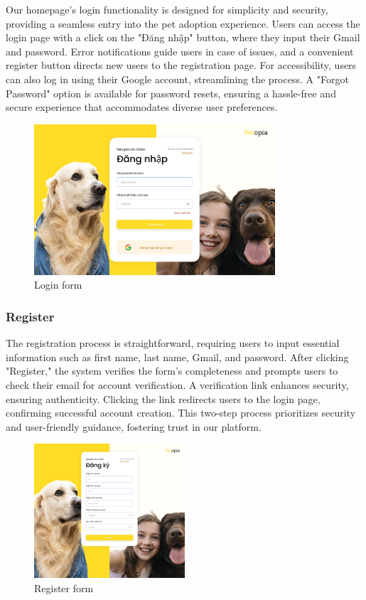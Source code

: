 Our homepage's login functionality is designed for simplicity and security, providing a seamless entry into the pet adoption experience. Users can access the login page with a click on the "Đăng nhập" button, where they input their Gmail and password. Error notifications guide users in case of issues, and a convenient register button directs new users to the registration page. For accessibility, users can also log in using their Google account, streamlining the process. A "Forgot Password" option is available for password resets, ensuring a hassle-free and secure experience that accommodates diverse user preferences.

\begin{figure}[H]
    \centering
    \includegraphics[width=0.8\textwidth]{Figures/UI/login_ui.png}
    \caption{Login form}
\end{figure}

\subsubsection{Register}

The registration process is straightforward, requiring users to input essential information such as first name, last name, Gmail, and password. After clicking "Register," the system verifies the form's completeness and prompts users to check their email for account verification. A verification link enhances security, ensuring authenticity. Clicking the link redirects users to the login page, confirming successful account creation. This two-step process prioritizes security and user-friendly guidance, fostering trust in our platform.

\begin{figure}[H]
    \centering
    \includegraphics[width=0.5\textwidth]{Figures/UI/register_ui.png}
    \caption{Register form}
\end{figure}

